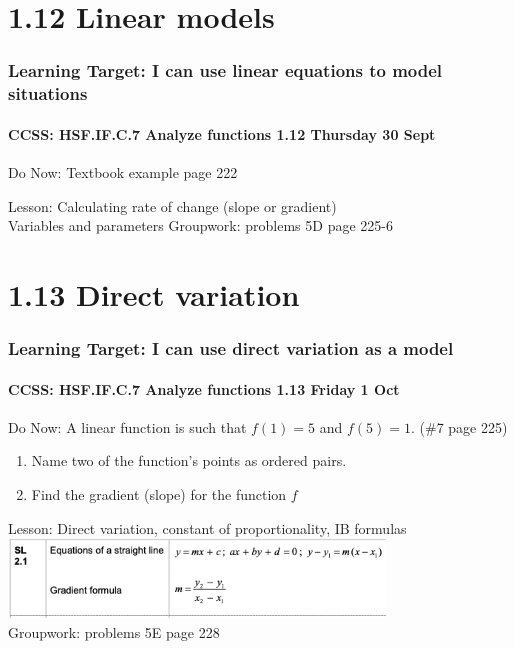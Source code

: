 \documentclass{beamer}
\begin{document}
  \section{1.12 Linear models}
  \frame
  {
    \frametitle{Learning Target: I can use linear equations to model situations}
    \framesubtitle{CCSS: HSF.IF.C.7 Analyze functions \hfill \alert{1.12 Thursday 30 Sept}}

    \begin{block}{Do Now: Textbook example page 222}
    \end{block}\vspace{0.5cm}
    Lesson: Calculating rate of change (slope or gradient)\\[0.25cm]
    Variables and parameters
    Groupwork: problems 5D page 225-6
  }

  \section{1.13 Direct variation}
  \frame
  {
    \frametitle{Learning Target: I can use direct variation as a model}
    \framesubtitle{CCSS: HSF.IF.C.7 Analyze functions \hfill \alert{1.13 Friday 1 Oct}}

    \begin{block}{Do Now: A linear function is such that $f(1)=5$ and $f(5)=1$.}
      \hspace{8cm} (\#7 page 225)
      \begin{enumerate}
        \item Name two of the function's points as ordered pairs.
        \item Find the gradient (slope) for the function $f$ 
      \end{enumerate}
    \end{block}\vspace{0.25cm}
    Lesson: Direct variation, constant of proportionality, IB formulas\\
    \includegraphics[width=10cm]{IB-formula-lines.png}\\
    Groupwork: problems 5E page 228
  }
\end{document}

